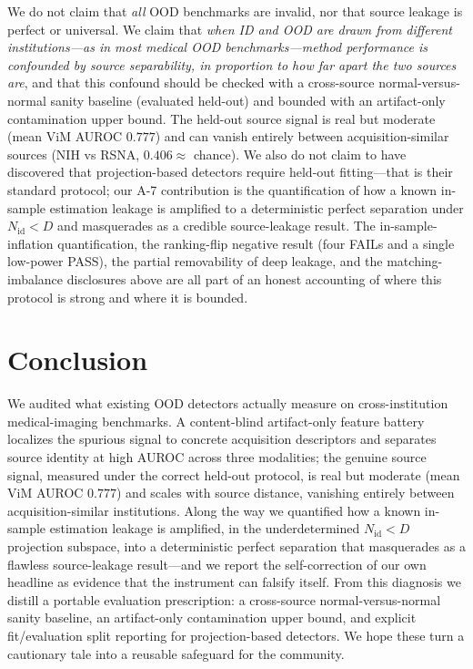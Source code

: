 \documentclass{article}
\begin{document}
We do not claim that \emph{all} OOD benchmarks are invalid, nor that source
leakage is perfect or universal. We claim that \emph{when ID and OOD are drawn
from different institutions---as in most medical OOD benchmarks---method
performance is confounded by source separability, in proportion to how far apart
the two sources are}, and that this confound should be checked with a cross-source
normal-versus-normal sanity baseline (evaluated held-out) and bounded with an
artifact-only contamination upper bound. The held-out source signal is real but
moderate (mean ViM AUROC $0.777$) and can vanish entirely between
acquisition-similar sources (NIH vs RSNA, $0.406 \approx$ chance). We also do not
claim to have discovered that projection-based detectors require held-out
fitting---that is their standard protocol; our A-7 contribution is the
quantification of how a known in-sample estimation leakage is amplified to a
deterministic perfect separation under $N_\text{id} < D$ and masquerades as a
credible source-leakage result. The in-sample-inflation quantification, the
ranking-flip negative result (four FAILs and a single low-power PASS), the
partial removability of deep leakage, and the matching-imbalance disclosures
above are all part of an honest accounting of where this protocol is strong and
where it is bounded.

\section{Conclusion}

We audited what existing OOD detectors actually measure on cross-institution
medical-imaging benchmarks. A content-blind artifact-only feature battery
localizes the spurious signal to concrete acquisition descriptors and separates
source identity at high AUROC across three modalities; the genuine source signal,
measured under the correct held-out protocol, is real but moderate (mean ViM
AUROC $0.777$) and scales with source distance, vanishing entirely between
acquisition-similar institutions. Along the way we quantified how a known
in-sample estimation leakage is amplified, in the underdetermined
$N_\text{id} < D$ projection subspace, into a deterministic perfect separation
that masquerades as a flawless source-leakage result---and we report the
self-correction of our own headline as evidence that the instrument can falsify
itself. From this diagnosis we distill a portable evaluation prescription: a
cross-source normal-versus-normal sanity baseline, an artifact-only contamination
upper bound, and explicit fit/evaluation split reporting for projection-based
detectors. We hope these turn a cautionary tale into a reusable safeguard for the
community.
\end{document}
